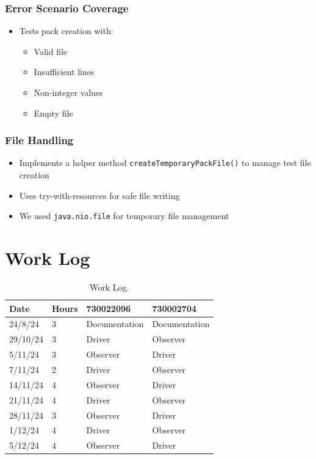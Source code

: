 \documentclass{article}
\begin{document}
\subsubsection{Error Scenario Coverage}
\begin{itemize}
    \item Tests pack creation with:
          \begin{itemize}
              \item Valid file
              \item Insufficient lines
              \item Non-integer values
              \item Empty file
          \end{itemize}
\end{itemize}

\subsubsection{File Handling}
\begin{itemize}
    \item Implements a helper method \texttt{createTemporaryPackFile()} to manage test file creation
    \item Uses try-with-resources for safe file writing
    \item We used \texttt{java.nio.file} for temporary file management
\end{itemize}

\clearpage
\section{Work Log}
\begin{table}[H]
    \centering
    \begin{tabular}{llll}
        \toprule
        \textbf{Date} & \textbf{Hours} & \textbf{730022096} & \textbf{730002704} \\
        \midrule
        24/8/24       & 3              & Documentation      & Documentation      \\
        29/10/24      & 3              & Driver             & Observer           \\
        5/11/24       & 3              & Observer           & Driver             \\
        7/11/24       & 2              & Driver             & Observer           \\
        14/11/24      & 4              & Observer           & Driver             \\
        21/11/24      & 4              & Driver             & Observer           \\
        28/11/24      & 3              & Observer           & Driver             \\
        1/12/24       & 4              & Driver             & Observer           \\
        5/12/24       & 4              & Observer           & Driver             \\
        \bottomrule
    \end{tabular}
    \caption{Work Log.}
    \label{tab:work-log}
\end{table}
\end{document}
